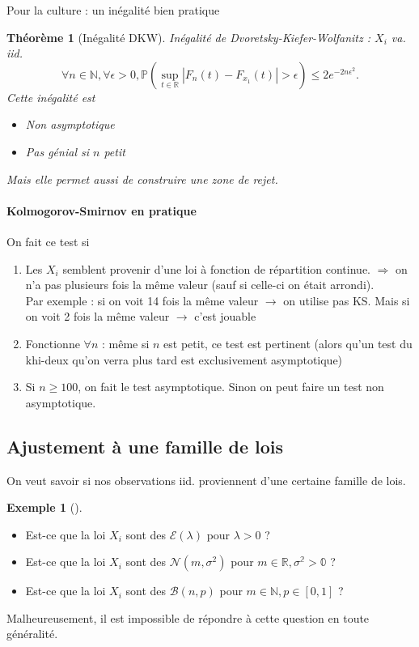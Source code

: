 \documentclass{article}
\theoremstyle{plain}%
\newtheorem{thm}{Théorème}[section]
\theoremstyle{definition}
\newtheorem{exmp}{Exemple}[section]
\theoremstyle{remark}
\begin{document}
Pour la culture : un inégalité bien pratique 
\begin{thm}[Inégalité DKW]
    Inégalité de Dvoretsky-Kiefer-Wolfanitz : $ X_i $ va. iid.
    \[
        \forall n \in \mathbb{N}, \forall \epsilon > 0, \mathbb{P}(\sup _{t \in \mathbb{R}} \left| F_n(t) - F_{x_1}(t) \right| > \epsilon ) \leq 2 e^{-2n \epsilon ^2}
    .\]
    Cette inégalité est \begin{itemize}
        \item Non asymptotique
        \item Pas génial si $ n $ petit
    \end{itemize}
    Mais elle permet aussi de construire une zone de rejet.
\end{thm}

\paragraph{Kolmogorov-Smirnov en pratique}
On fait ce test si 
\begin{enumerate}
    \item Les $ X_i $ semblent provenir d'une loi à fonction de répartition continue. $ \Rightarrow  $ on n'a pas plusieurs fois la même valeur (sauf si celle-ci on était arrondi).\\
    Par exemple : si on voit 14 fois la même valeur $\rightarrow$ on utilise pas KS. Mais si on voit 2 fois la même valeur $\rightarrow$ c'est jouable
    \item Fonctionne $ \forall n $ : même si $ n $ est petit, ce test est pertinent (alors qu'un test du khi-deux qu'on verra plus tard est exclusivement asymptotique)
    \item Si $ n \geq 100 $, on fait le test asymptotique. Sinon on peut faire un test non asymptotique.
\end{enumerate}

\subsection{Ajustement à une famille de lois}
On veut savoir si nos observations iid. proviennent d'une certaine famille de lois. 
\begin{exmp}[]
    \begin{itemize}
        \item Est-ce que la loi $ X_i $ sont des $ \mathcal{E}(\lambda) $ pour $ \lambda >0 $ ?
        \item Est-ce que la loi $ X_i $ sont des $ \mathcal{N}(m, \sigma ^2) $ pour $ m \in \mathbb{R, \sigma ^2 > 0} $ ?
        \item Est-ce que la loi $ X_i $ sont des $ \mathcal{B}(n,p) $ pour $ m \in \mathbb{N}, p \in [0,1] $ ?
    \end{itemize}
\end{exmp}
Malheureusement, il est impossible de répondre à cette question en toute généralité. 
\end{document}
